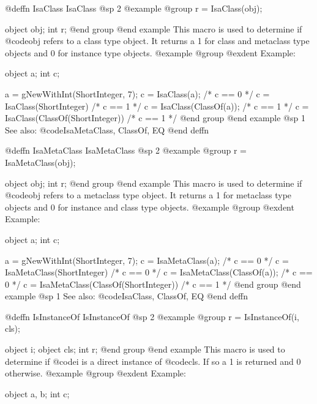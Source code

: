 {{{{@deffn {IsaClass} IsaClass
@sp 2
@example
@group
r = IsaClass(obj);

object  obj;
int     r;
@end group
@end example
This macro is used to determine if @code{obj} refers to a class type
object.  It returns a 1 for class and metaclass type objects and 0 for
instance type objects.
@example
@group
@exdent Example:

object  a;
int     c;

a = gNewWithInt(ShortInteger, 7);
c = IsaClass(a);            /* c == 0  */
c = IsaClass(ShortInteger)  /* c == 1  */
c = IsaClass(ClassOf(a));   /* c == 1  */
c = IsaClass(ClassOf(ShortInteger))  /* c == 1  */
@end group
@end example
@sp 1
See also:  @code{IsaMetaClass, ClassOf, EQ}
@end deffn


















@deffn {IsaMetaClass} IsaMetaClass
@sp 2
@example
@group
r = IsaMetaClass(obj);

object  obj;
int     r;
@end group
@end example
This macro is used to determine if @code{obj} refers to a metaclass
type object.  It returns a 1 for metaclass type objects and 0 for
instance and class type objects.
@example
@group
@exdent Example:

object  a;
int     c;

a = gNewWithInt(ShortInteger, 7);
c = IsaMetaClass(a);            /* c == 0  */
c = IsaMetaClass(ShortInteger)  /* c == 0  */
c = IsaMetaClass(ClassOf(a));   /* c == 0  */
c = IsaMetaClass(ClassOf(ShortInteger))  /* c == 1  */
@end group
@end example
@sp 1
See also:  @code{IsaClass, ClassOf, EQ}
@end deffn














@deffn {IsInstanceOf} IsInstanceOf
@sp 2
@example
@group
r = IsInstanceOf(i, cls);

object  i;
object  cls;
int     r;
@end group
@end example
This macro is used to determine if @code{i} is a direct
instance of @code{cls}.  If so a 1 is returned and 0 otherwise.
@example
@group
@exdent Example:

object  a, b;
int     c;

}}}}
